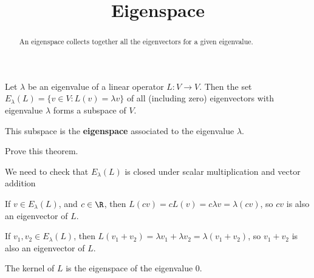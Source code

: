 \documentclass{ximera}
\title{Eigenspace}
\begin{document}
\begin{abstract}
  An eigenspace collects together all the eigenvectors for a given eigenvalue.
\end{abstract}

\begin{theorem}
  Let $\lambda$ be an eigenvalue of a linear operator $L:V\to V$.
  Then the set $E_\lambda(L) = \{ v \in V: L(v) = \lambda v\}$ of all
  (including zero) eigenvectors with eigenvalue $\lambda$ forms a
  subspace of $V$.

  This subspace is the \textbf{eigenspace} associated to the
  eigenvalue $\lambda$.
\end{theorem}

Prove this theorem.
\begin{free-response}
	We need to check that $E_\lambda(L)$ is closed under scalar multiplication and vector addition
	
	If $v \in E_\lambda(L)$, and $c \in \R$, then $L(cv) = cL(v) = c\lambda v = \lambda( cv)$, so $cv$ is also an eigenvector of $L$.
	
	If $v_1,v_2 \in E_\lambda(L)$, then $L(v_1+v_2) = \lambda v_1+\lambda v_2 = \lambda( v_1 + v_2)$, so $v_1+v_2$ is also an eigenvector of $L$.
\end{free-response}

The kernel of $L$ is the eigenspace of the eigenvalue $0$.
\end{document}
